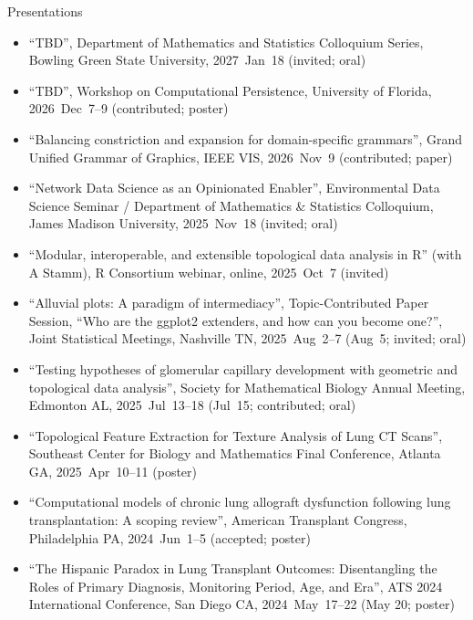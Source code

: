 \documentclass[10pt,a4paper]{article}
\begin{document}
\vspace{.25cm}
{\sc Presentations}
\begin{itemize}[label=$\circ$,nolistsep]
\item
``TBD'', Department of Mathematics and Statistics Colloquium Series, Bowling Green State University, 2027~Jan~18 (invited; oral)
\item
``TBD'', Workshop on Computational Persistence, University of Florida, 2026~Dec~7--9 (contributed; poster)
\item
``Balancing constriction and expansion for domain-specific grammars'', Grand Unified Grammar of Graphics, IEEE VIS, 2026~Nov~9 (contributed; paper)
\item
``Network Data Science as an Opinionated Enabler'', Environmental Data Science Seminar / Department of Mathematics \& Statistics Colloquium, James Madison University, 2025~Nov~18 (invited; oral)
\item
``Modular, interoperable, and extensible topological data analysis in R'' (with A Stamm), R Consortium webinar, online, 2025~Oct~7 (invited)
\item
``Alluvial plots: A paradigm of intermediacy'', Topic-Contributed Paper Session, ``Who are the ggplot2 extenders, and how can you become one?'', Joint Statistical Meetings, Nashville TN, 2025~Aug~2--7 (Aug~5; invited; oral)
\item
``Testing hypotheses of glomerular capillary development with geometric and topological data analysis'', Society for Mathematical Biology Annual Meeting, Edmonton AL, 2025~Jul~13--18 (Jul~15; contributed; oral)
\item
``Topological Feature Extraction for Texture Analysis of Lung CT Scans'', Southeast Center for Biology and Mathematics Final Conference, Atlanta GA, 2025~Apr~10--11 (poster)
\item
``Computational models of chronic lung allograft dysfunction following lung transplantation: A scoping review'', American Transplant Congress, Philadelphia PA, 2024~Jun~1--5 (accepted; poster)
\item
``The Hispanic Paradox in Lung Transplant Outcomes: Disentangling the Roles of Primary Diagnosis, Monitoring Period, Age, and Era'', ATS 2024 International Conference, San Diego CA, 2024~May~17--22 (May 20; poster)

\end{itemize}
\end{document}
